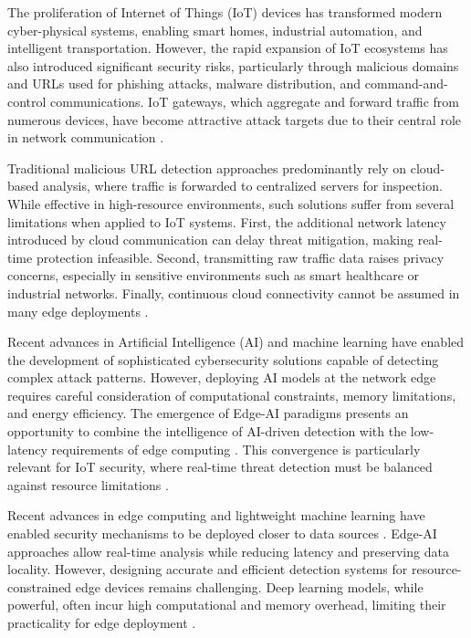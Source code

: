 \documentclass[conference]{IEEEtran}
\begin{document}
The proliferation of Internet of Things (IoT) devices has transformed modern cyber-physical systems, enabling smart homes, industrial automation, and intelligent transportation. However, the rapid expansion of IoT ecosystems has also introduced significant security risks, particularly through malicious domains and URLs used for phishing attacks, malware distribution, and command-and-control communications. IoT gateways, which aggregate and forward traffic from numerous devices, have become attractive attack targets due to their central role in network communication \cite{ref_iot_security}.

Traditional malicious URL detection approaches predominantly rely on cloud-based analysis, where traffic is forwarded to centralized servers for inspection. While effective in high-resource environments, such solutions suffer from several limitations when applied to IoT systems. First, the additional network latency introduced by cloud communication can delay threat mitigation, making real-time protection infeasible. Second, transmitting raw traffic data raises privacy concerns, especially in sensitive environments such as smart healthcare or industrial networks. Finally, continuous cloud connectivity cannot be assumed in many edge deployments \cite{ref_edge_security}.

Recent advances in Artificial Intelligence (AI) and machine learning have enabled the development of sophisticated cybersecurity solutions capable of detecting complex attack patterns. However, deploying AI models at the network edge requires careful consideration of computational constraints, memory limitations, and energy efficiency. The emergence of Edge-AI paradigms presents an opportunity to combine the intelligence of AI-driven detection with the low-latency requirements of edge computing \cite{ref_edge_ai}. This convergence is particularly relevant for IoT security, where real-time threat detection must be balanced against resource limitations \cite{ref_ai_iot_security}.

Recent advances in edge computing and lightweight machine learning have enabled security mechanisms to be deployed closer to data sources \cite{ref_edge_ai}. Edge-AI approaches allow real-time analysis while reducing latency and preserving data locality. However, designing accurate and efficient detection systems for resource-constrained edge devices remains challenging. Deep learning models, while powerful, often incur high computational and memory overhead, limiting their practicality for edge deployment \cite{ref_edge_latency}.
\end{document}
